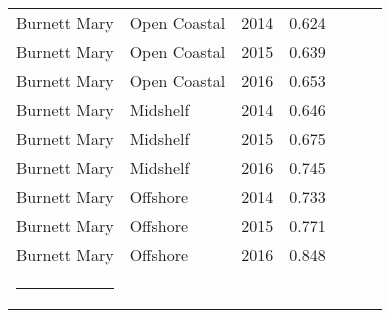 {\begin{longtable}{llccccc}
  Burnett Mary & Open Coastal & 2014 & 0.624 & \cellcolor[HTML]{F0C918}{C} & \cellcolor[HTML]{B0D235}{B} & \cellcolor[HTML]{F0C918}{C} \\ 
  Burnett Mary & Open Coastal & 2015 & 0.639 & \cellcolor[HTML]{F0C918}{C} & \cellcolor[HTML]{B0D235}{B} & \cellcolor[HTML]{F0C918}{C} \\ 
  Burnett Mary & Open Coastal & 2016 & 0.653 & \cellcolor[HTML]{F0C918}{C} & \cellcolor[HTML]{B0D235}{B} & \cellcolor[HTML]{B0D235}{B} \\ 
  Burnett Mary & Midshelf & 2014 & 0.646 & \cellcolor[HTML]{F0C918}{C} & \cellcolor[HTML]{B0D235}{B} & \cellcolor[HTML]{F0C918}{C} \\ 
  Burnett Mary & Midshelf & 2015 & 0.675 & \cellcolor[HTML]{B0D235}{B} & \cellcolor[HTML]{B0D235}{B} & \cellcolor[HTML]{B0D235}{B} \\ 
  Burnett Mary & Midshelf & 2016 & 0.745 & \cellcolor[HTML]{B0D235}{B} & \cellcolor[HTML]{B0D235}{B} & \cellcolor[HTML]{B0D235}{B} \\ 
  Burnett Mary & Offshore & 2014 & 0.733 & \cellcolor[HTML]{B0D235}{B} & \cellcolor[HTML]{B0D235}{B} & \cellcolor[HTML]{B0D235}{B} \\ 
  Burnett Mary & Offshore & 2015 & 0.771 & \cellcolor[HTML]{B0D235}{B} & \cellcolor[HTML]{B0D235}{B} & \cellcolor[HTML]{B0D235}{B} \\ 
  Burnett Mary & Offshore & 2016 & 0.848 & \cellcolor[HTML]{00734D}{A} & \cellcolor[HTML]{00734D}{A} & \cellcolor[HTML]{B0D235}{B} \\ 
   \hrule
\end{longtable}
}
